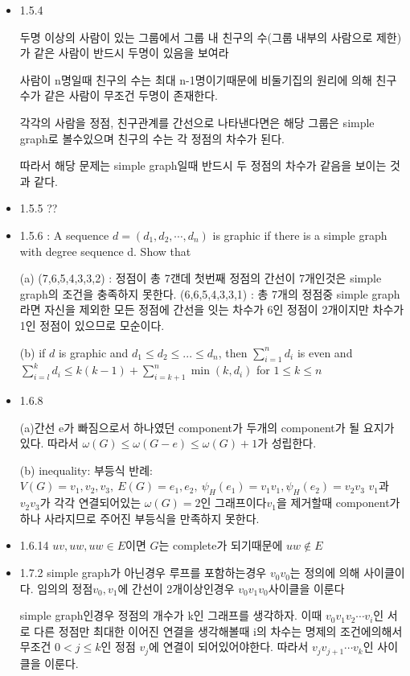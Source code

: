 \documentclass{oblivoir}
\begin{document}
\begin{itemize}
    \item 1.5.4

    두명 이상의 사람이 있는 그룹에서 그룹 내 친구의 수(그룹 내부의 사람으로 제한)가 같은 사람이 반드시 두명이 있음을 보여라

    사람이 n명일때 친구의 수는 최대 n-1명이기때문에 비둘기집의 원리에 의해 친구 수가 같은 사람이 무조건 두명이 존재한다.

    각각의 사람을 정점, 친구관계를 간선으로 나타낸다면은 해당 그룹은 simple graph로 볼수있으며 친구의 수는 각 정점의 차수가 된다.

    따라서 해당 문제는 simple graph일때 반드시 두 정점의 차수가 같음을 보이는 것과 같다. 
    \item 1.5.5
    ??
    \item 1.5.6 : A sequence $d = (d_1, d_2 , \cdots , d_n)$ is graphic if there is a simple graph with degree sequence d. Show that

    (a) (7,6,5,4,3,3,2) : 정점이 총 7갠데 첫번째 정점의 간선이 7개인것은 simple graph의 조건을 충족하지 못한다.
    (6,6,5,4,3,3,1) : 총 7개의 정점중 simple graph라면 자신을 제외한 모든 정점에 간선을 잇는 차수가 6인 정점이 2개이지만 차수가 1인 정점이 있으므로 모순이다.

    (b) if $d$ is graphic and $d_1 \le d_2 \le ... \le d_n$, then $\sum_{i=1}^{n} d_i$ is even and $\sum_{i=l}^{k} d_i \le k(k -1)+\sum_{i=k+1}^{n}\min(k, d_i)$ for $1 \le k \le n$


    \item 1.6.8

    (a)간선 e가 빠짐으로서 하나였던 component가 두개의 component가 될 요지가 있다. 따라서 $\omega(G) \le \omega(G-e) \le \omega(G)+1 $가 성립한다.

    (b) inequality: 부등식
    반례: $V(G) = { v_1, v_2, v_3} ,\: E(G) = { e_1 , e_2} ,\: \psi_H(e_1) = v_1v_1 ,\psi_H(e_2) = v_2v_3  $
    $v_1$과 $v_2v_3$가 각각 연결되어있는 $\omega(G) = 2$인 그래프이다$v_1$을 제거할때 component가 하나 사라지므로 주어진 부등식을 만족하지 못한다.

    \item 1.6.14
    $uv, uw, uw \in E $이면 $G$는 complete가 되기때문에 $uw \notin E$


    \item 1.7.2
    simple graph가 아닌경우
          루프를 포함하는경우 $v_0v_0$는 정의에 의해 사이클이다.
               임의의 정점$v_0, v_1$에 간선이 2개이상인경우            $v_0v_1v_0$사이클을 이룬다
         
        simple graph인경우
            정점의 개수가 k인 그래프를 생각하자. 이때 $v_0v_1v_2 \cdots v_i$인 서로 다른 정점만 최대한 이어진 연결을 생각해볼때 i의 차수는 명제의 조건에의해서 무조건 $0<j \le k$인 정점 $v_j$에 연결이 되어있어야한다. 따라서 $v_{j}v_{j+1} \cdots v_k$인 사이클을 이룬다.


\end{itemize}
\end{document}
